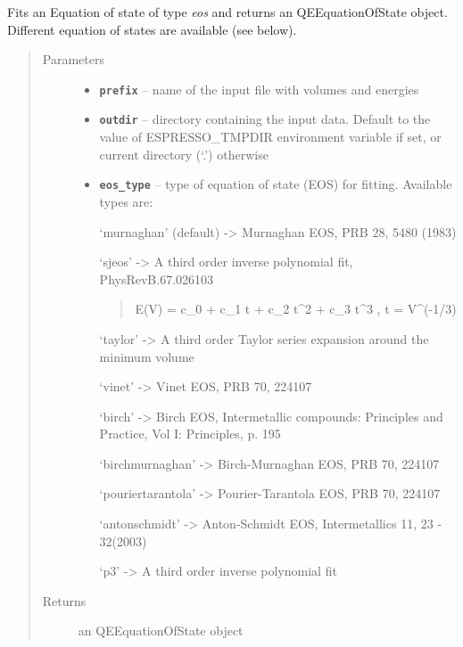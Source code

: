 \documentclass[letterpaper,10pt,english]{sphinxmanual}
\begin{document}
\begin{fulllineitems}
\label{postqe:postqe.api.get_eos}
Fits an Equation of state of type \emph{eos} and returns an QEEquationOfState object.
Different equation of states are available (see below).
\begin{quote}\begin{description}
\item[{Parameters}] \leavevmode\begin{itemize}
\item {} 
\textbf{\texttt{prefix}} -- name of the input file with volumes and energies

\item {} 
\textbf{\texttt{outdir}} -- directory containing the input data. Default to the value of
ESPRESSO\_TMPDIR environment variable if set, or current directory (`.') otherwise

\item {} 
\textbf{\texttt{eos\_type}} -- 
type of equation of state (EOS) for fitting. Available types are:

`murnaghan' (default) -\textgreater{} Murnaghan EOS, PRB 28, 5480 (1983)

`sjeos' -\textgreater{} A third order inverse polynomial fit, PhysRevB.67.026103
\begin{quote}

E(V) = c\_0 + c\_1 t + c\_2 t\textasciicircum{}2  + c\_3 t\textasciicircum{}3 ,  t = V\textasciicircum{}(-1/3)
\end{quote}

`taylor' -\textgreater{} A third order Taylor series expansion around the minimum volume

`vinet' -\textgreater{} Vinet EOS, PRB 70, 224107

`birch' -\textgreater{} Birch EOS, Intermetallic compounds: Principles and Practice, Vol I: Principles, p. 195

`birchmurnaghan' -\textgreater{} Birch-Murnaghan EOS, PRB 70, 224107

`pouriertarantola' -\textgreater{} Pourier-Tarantola EOS, PRB 70, 224107

`antonschmidt' -\textgreater{} Anton-Schmidt EOS, Intermetallics 11, 23 - 32(2003)

`p3' -\textgreater{} A third order inverse polynomial fit


\end{itemize}

\item[{Returns}] \leavevmode
an QEEquationOfState object

\end{description}\end{quote}

\end{fulllineitems}
\end{document}
